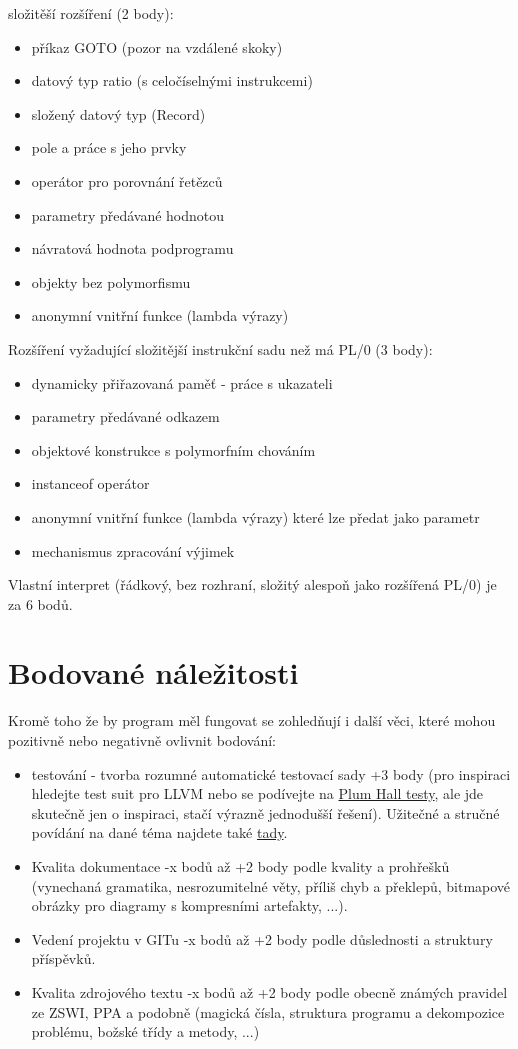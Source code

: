 \documentclass[
12pt,
a4paper,
pdftex,
czech,
titlepage
]{report}
\begin{document}
složitěší rozšíření (2 body):
\begin{itemize}
\item příkaz GOTO (pozor na vzdálené skoky)
\item datový typ ratio (s celočíselnými instrukcemi)
\item složený datový typ (Record)
\item pole a práce s jeho prvky
\item operátor pro porovnání řetězců
\item parametry předávané hodnotou
\item návratová hodnota podprogramu
\item objekty bez polymorfismu
\item anonymní vnitřní funkce (lambda výrazy)
\end{itemize}

Rozšíření vyžadující složitější instrukční sadu než má PL/0 (3 body):

\begin{itemize}
\item dynamicky přiřazovaná paměť - práce s ukazateli
\item parametry předávané odkazem
\item objektové konstrukce s polymorfním chováním
\item instanceof operátor
\item anonymní vnitřní funkce (lambda výrazy) které lze předat jako parametr
\item mechanismus zpracování výjimek
\end{itemize}

Vlastní interpret (řádkový, bez rozhraní, složitý alespoň jako rozšířená PL/0) je za 6 bodů. 

\section{Bodované náležitosti}

Kromě toho že by program měl fungovat se zohledňují i další věci, které mohou pozitivně nebo negativně ovlivnit bodování:

\begin{itemize}
\item testování - tvorba rozumné automatické testovací sady +3 body (pro inspiraci hledejte test suit pro LLVM nebo se podívejte na \href{http://www.plumhall.com/suites.html}{Plum Hall testy}, ale jde skutečně jen o inspiraci, stačí výrazně jednodušší řešení). Užitečné a stručné povídání na dané téma najdete také \href{http://www.engr.mun.ca/~theo/Publications/compiler-testing.pdf}{tady}.
\item Kvalita dokumentace -x bodů až +2 body podle kvality a prohřešků (vynechaná gramatika, nesrozumitelné věty, příliš chyb a překlepů, bitmapové obrázky pro diagramy s kompresními artefakty, ...).
\item Vedení projektu v GITu -x bodů až +2 body podle důslednosti a struktury příspěvků.
\item Kvalita zdrojového textu -x bodů až +2 body podle obecně známých pravidel ze ZSWI, PPA a podobně (magická čísla, struktura programu a dekompozice problému, božské třídy a metody, ...)
\end{itemize}
\end{document}
